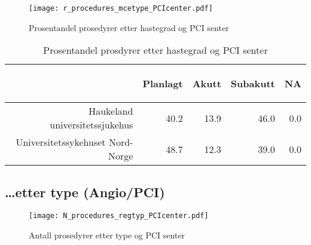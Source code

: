 \documentclass[norsk, a4paper]{report}
\begin{document}
\clearpage


\begin{figure}[ht]
  \centering
\texttt{[image: r\_procedures\_mcetype\_PCIcenter.pdf]}\caption{Prosentandel prosedyrer etter hastegrad og PCI senter}
\end{figure}


\begin{tiny}
\begin{table}[ht]
\centering
\begin{tabular}{rrrrr}
  \toprule
 & \begin{sideways} Planlagt \end{sideways} & \begin{sideways} Akutt \end{sideways} & \begin{sideways} Subakutt \end{sideways} & \begin{sideways} NA \end{sideways} \\ 
  \midrule
Haukeland universitetssjukehus & 40.2 & 13.9 & 46.0 & 0.0 \\ 
  Universitetssykehuset Nord-Norge & 48.7 & 12.3 & 39.0 & 0.0 \\ 
   \bottomrule
\end{tabular}
\caption{Prosentandel prosdyrer etter hastegrad og PCI senter} 
\end{table}\end{tiny}



\clearpage
\subsection{\ldots etter type (Angio/PCI)}


\begin{figure}[ht]
  \centering
\texttt{[image: N\_procedures\_regtyp\_PCIcenter.pdf]}  \caption{Antall prosedyrer etter type og PCI senter}
\end{figure}
\end{document}

